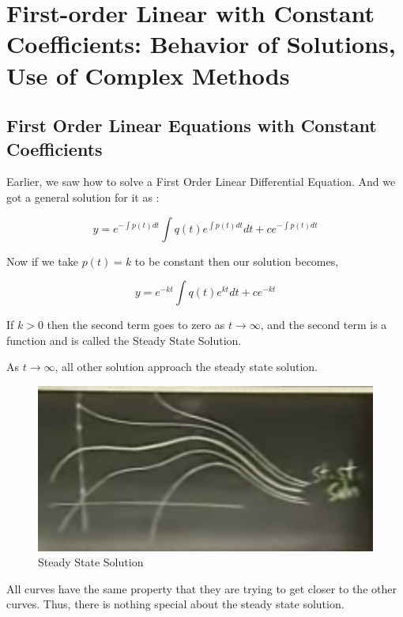 

\chapter{First-order Linear with Constant Coefficients: Behavior of Solutions, Use of Complex Methods} 

\bigbreak

\section{First Order Linear Equations with Constant Coefficients}

Earlier, we saw how to solve a First Order Linear Differential Equation. 
And we got a general solution for it as :

$$ y = e^{-\int p(t)dt } \int q(t) e^{\int p(t) dt} dt + ce^{- \int p(t) dt} $$

Now if we take $p(t) = k$ to be constant then our solution becomes,

$$ y = e^{-kt} \int q(t) e^{kt} dt + ce^{-kt} $$

If $k > 0$ then the second term goes to zero as $t \to \infty$, and the second term is a function and is called the Steady State Solution.

As $t \to \infty$, all other solution approach the steady state solution.

\begin{figure}[ht!]
    \centering
    \includegraphics[scale=0.5]{./images/lecture_7_figure_1.png}
    \caption{Steady State Solution}
\end{figure}

All curves have the same property that they are trying to get closer to the other curves.
Thus, there is nothing special about the steady state solution.

